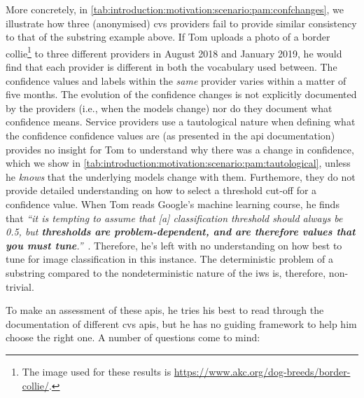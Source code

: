 

More concretely, in \cref{tab:introduction:motivation:scenario:pam:confchanges}, we illustrate how three (anonymised) \gls{cvs} providers fail to provide similar consistency to that of the substring example above. If Tom uploads a photo of a border collie\footnote{The image used for these results is \url{https://www.akc.org/dog-breeds/border-collie/}.} to three different providers in August 2018 and January 2019, he would find that each provider is different in both the vocabulary used between. The confidence values and labels within the \textit{same} provider varies within a matter of five months. The evolution of the confidence changes is not explicitly documented by the providers (i.e., when the models change) nor do they document what confidence means. Service providers use a tautological nature when defining what the confidence confidence values are (as presented in the \gls{api} documentation) provides no insight for Tom to understand why there was a change in confidence, which we show in \cref{tab:introduction:motivation:scenario:pam:tautological}, unless he \textit{knows} that the underlying models change with them. Furthemore, they do not provide detailed understanding on how to select a threshold cut-off for a confidence value. When Tom reads Google's machine learning course, he finds that \textit{``it is tempting to assume that [a] classification threshold should always be 0.5, but \textbf{thresholds are problem-dependent, and are therefore values that you must tune}.''}~. Therefore, he's left with no understanding on how best to tune for image classification in this instance. The deterministic problem of a substring compared to the nondeterministic nature of the \gls{iws} is, therefore, non-trivial.



To make an assessment of these \glspl{api}, he tries his best to read through the documentation of different \gls{cvs} \glspl{api}, but he has no guiding framework to help him choose the right one. A number of questions come to mind:

